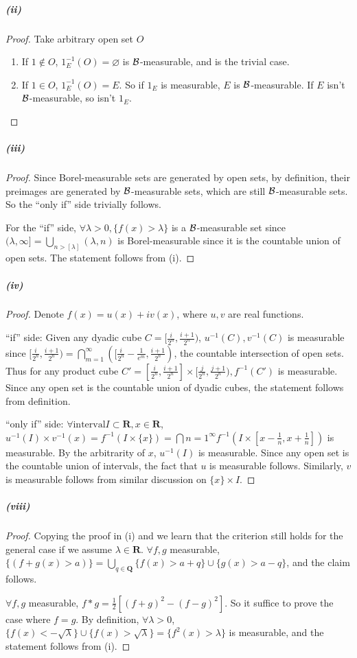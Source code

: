 \documentclass{article}
\begin{document}
\subparagraph{(ii)}
\begin{proof}
Take arbitrary open set $O$ 
\begin{enumerate}
\item If $1\not\in O$, $1_E^{-1}(O)=\varnothing$ is $\mathcal{B}$-measurable, and is the trivial case.
\item If $1\in O$, $1_E^{-1}(O)=E$. So if $1_E$ is measurable, $E$ is $\mathcal{B}$-measurable. If $E$ isn't $\mathcal{B}$-measurable, so isn't $1_E$.
\end{enumerate}
\end{proof}

\subparagraph{(iii)}
\begin{proof}
Since Borel-measurable sets are generated by open sets, by definition, their preimages are generated by $\mathcal{B}$-measurable sets, which are still $\mathcal{B}$-measurable sets. So the ``only if'' side trivially follows.

For the ``if'' side, $\forall \lambda>0, \{f(x)>\lambda\}$ is a $\mathcal{B}$-measurable set since $(\lambda,\infty]=\bigcup\limits_{n>[\lambda]}(\lambda,n)$ is Borel-measurable since it is the countable union of open sets. The statement follows from (i).  
\end{proof}

\subparagraph{(iv)}
\begin{proof}
Denote $f(x)=u(x)+iv(x)$, where $u,v$ are real functions.

``if'' side: Given any dyadic cube $C=[\frac{i}{2^n},\frac{i+1}{2^n})$, $u^{-1}(C),v^{-1}(C)$ is measurable since $[\frac{i}{2^n},\frac{i+1}{2^n})=\bigcap\limits_{m=1}^{\infty}([\frac{i}{2^n}-\frac{1}{e^m},\frac{i+1}{2^n})$, the countable intersection of open sets. Thus for any product cube $C'=[\frac{i}{2^n},\frac{i+1}{2^n}]\times [\frac{j}{2^n},\frac{j+1}{2^n}), f^{-1}(C')$ is measurable. Since any open set is the countable union of dyadic cubes, the statement follows from definition.

``only if'' side: $\forall \text{interval} I\subset \mathbf{R},x\in \mathbf{R}$, $u^{-1}(I)\times v^{-1}(x)=f^{-1}(I\times \{x\})=\bigcap\limits{n=1}^{\infty}f^{-1}(I\times [x-\frac 1 n,x+\frac 1 n])$ is measurable. By the arbitrarity of $x$, $u^{-1}(I)$ is measurable. Since any open set is the countable union of intervals, the fact that $u$ is measurable follows. Similarly, $v$ is measurable follows from similar discussion on $\{x\}\times I$.
\end{proof}

\subparagraph{(viii)}
\begin{proof}
Copying the proof in (i) and  we learn that the criterion still holds for the general case if we assume $\lambda\in\mathbf{R}$.  $\forall f,g$ measurable, $\{(f+g(x)>a)\}=\bigcup\limits_{q\in\mathbf{Q}}\{f(x)>a+q\}\cup \{g(x)>a-q\}$, and the claim follows.

$\forall f,g$ measurable, $f*g=\frac 1 2 [(f+g)^2-(f-g)^2]$. So it suffice to prove the case where $f=g$. By definition, $\forall \lambda>0$, $\{f(x)<-\sqrt{\lambda}\}\cup \{f(x)>\sqrt{\lambda}\}=\{f^2(x)>\lambda\}$ is measurable, and the statement follows from (i).
\end{proof}
\end{document}
